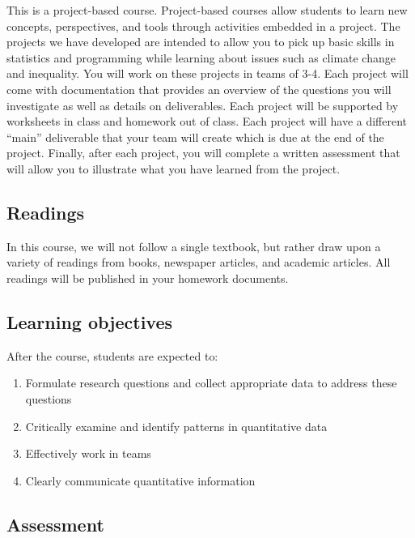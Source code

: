 \documentclass[
]{article}
\begin{document}
This is a project-based course. Project-based courses allow students to learn new concepts, perspectives, and tools through activities embedded in a project. The projects we have developed are intended to allow you to pick up basic skills in statistics and programming while learning about issues such as climate change and inequality.
You will work on these projects in teams of 3-4. Each project will come with documentation that provides an overview of the questions you will investigate as well as details on deliverables. Each project will be supported by worksheets in class and homework out of class. Each project will have a different ``main'' deliverable that your team will create which is due at the end of the project. Finally, after each project, you will complete a written assessment that will allow you to illustrate what you have learned from the project.

\hypertarget{readings}{%
\subsection*{Readings}\label{readings}}

In this course, we will not follow a single textbook, but rather draw upon a variety of readings from books, newspaper articles, and academic articles. All readings will be published in your homework documents.

\hypertarget{learning-objectives}{%
\subsection*{Learning objectives}\label{learning-objectives}}

After the course, students are expected to:

\begin{enumerate}
\def\labelenumi{\arabic{enumi}.}
\item
  Formulate research questions and collect appropriate data to address these questions
\item
  Critically examine and identify patterns in quantitative data
\item
  Effectively work in teams
\item
  Clearly communicate quantitative information
\end{enumerate}

\hypertarget{assessment}{%
\subsection*{Assessment}\label{assessment}}
\end{document}
